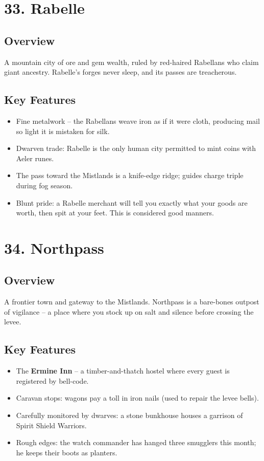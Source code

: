 \documentclass[11pt]{article}
\begin{document}
\section*{33. Rabelle}

\subsection*{Overview}
A mountain city of ore and gem wealth, ruled by red-haired Rabellans who claim giant ancestry. Rabelle's forges never sleep, and its passes are treacherous.

\subsection*{Key Features}
\begin{itemize}[leftmargin=*]
    \item Fine metalwork -- the Rabellans weave iron as if it were cloth, producing mail so light it is mistaken for silk.
    \item Dwarven trade: Rabelle is the only human city permitted to mint coins with Aeler runes.
    \item The pass toward the Mistlands is a knife-edge ridge; guides charge triple during fog season.
    \item Blunt pride: a Rabelle merchant will tell you exactly what your goods are worth, then spit at your feet. This is considered good manners.
\end{itemize}

\section*{34. Northpass}

\subsection*{Overview}
A frontier town and gateway to the Mistlands. Northpass is a bare-bones outpost of vigilance -- a place where you stock up on salt and silence before crossing the levee.

\subsection*{Key Features}
\begin{itemize}[leftmargin=*]
    \item The \textbf{Ermine Inn} -- a timber-and-thatch hostel where every guest is registered by bell-code.
    \item Caravan stops: wagons pay a toll in iron nails (used to repair the levee bells).
    \item Carefully monitored by dwarves: a stone bunkhouse houses a garrison of Spirit Shield Warriors.
    \item Rough edges: the watch commander has hanged three smugglers this month; he keeps their boots as planters.
\end{itemize}
\end{document}
